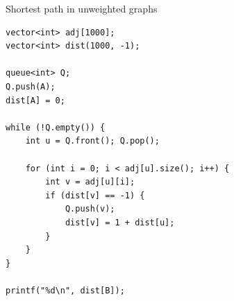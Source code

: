 \documentclass{beamer}
\begin{document}
\begin{frame}{Shortest path in unweighted graphs}

    \begin{verbatim}
vector<int> adj[1000];
vector<int> dist(1000, -1);

queue<int> Q;
Q.push(A);
dist[A] = 0;

while (!Q.empty()) {
    int u = Q.front(); Q.pop();

    for (int i = 0; i < adj[u].size(); i++) {
        int v = adj[u][i];
        if (dist[v] == -1) {
            Q.push(v);
            dist[v] = 1 + dist[u];
        }
    }
}

printf("%d\n", dist[B]);
    \end{verbatim}

\end{frame}


\end{document}

